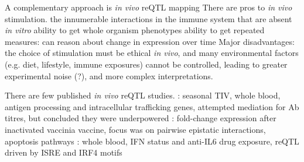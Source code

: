 \begin{outline}

\1 A complementary approach is \textit{in vivo} \gls{reQTL} mapping
    \2 There are pros to \textit{in vivo} stimulation.
        \3 the innumerable interactions in the immune system that are absent \textit{in vitro}
        \3 ability to get whole organism phenotypes
        \3 ability to get repeated measures: can reason about change in expression over time
    \2 Major disadvantages: 
        the choice of stimulation must be ethical \textit{in vivo}, 
        and many environmental factors (e.g. diet, lifestyle, immune exposures) cannot be controlled, leading to greater experimental noise (?), and more complex interpretations.

    \2 There are few published \textit{in vivo} \gls{reQTL} studies.
        \3 \autocite{franco2013IntegrativeGenomicAnalysis}: seasonal \gls{TIV}, whole blood, antigen processing and intracellular trafficking genes, attempted mediation for Ab titres, but concluded they were underpowered
        \3 \autocite{lareau2016InteractionQuantitativeTrait}: fold-change expression after inactivated vaccinia vaccine, focus was on pairwise epistatic interactions, apoptosis pathways
        \3 \autocite{davenport2018DiscoveringVivoCytokineeQTL}: whole blood, IFN status and anti-IL6 drug exposure, reQTL driven by ISRE and IRF4 motifs


\end{outline}
